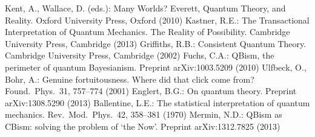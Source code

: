 \documentclass[12pt]{article}
\begin{document}
\begin{thebibliography}{99}
Kent, A., Wallace, D. (eds.):
Many Worlds? Everett, Quantum Theory, and Reality.
Oxford University Press, Oxford (2010)
%
 Kastner, R.E.:
The Transactional Interpretation of
Quantum Mechanics.  The Reality of Possibility.
Cambridge University Press, Cambridge (2013)
%
 Griffiths, R.B.:
Consistent Quantum Theory.
Cambridge University Press, Cambridge (2002)
%
 Fuchs, C.A.:
QBism, the perimeter of quantum Bayesianism.
Preprint arXiv:1003.5209 (2010)
%
 Ulfbeck, O., Bohr, A.:
Genuine fortuitousness.  Where did that click
come from?
Found.\ Phys.\ 31, 757--774 (2001)
%
 Englert, B.G.:
On quantum theory.
Preprint arXiv:1308.5290 (2013)
%
 Ballentine, L.E.:
The statistical interpretation of
quantum mechanics.
Rev.\ Mod.\ Phys.\ 42, 358--381 (1970)
%
 Mermin, N.D.:
QBism as CBism: solving the problem of `the Now'.
Preprint arXiv:1312.7825 (2013)
%
\end{thebibliography}
%
\end{document}

